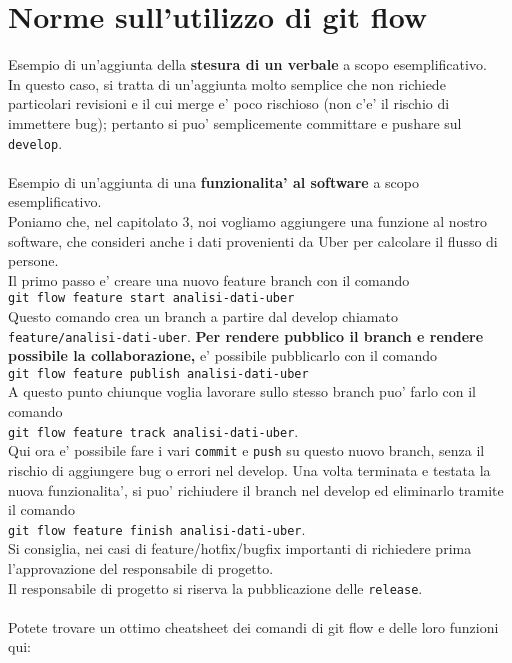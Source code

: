 \chapter{Norme sull'utilizzo di git flow}
Esempio di un'aggiunta della \textbf{stesura di un verbale} a scopo esemplificativo. \\
In questo caso, si tratta di un'aggiunta molto semplice che non richiede particolari revisioni e il cui merge e' poco rischioso (non c'e' il rischio di immettere bug); pertanto si puo' semplicemente committare e pushare sul \texttt{develop}.\\
\\
Esempio di un'aggiunta di una \textbf{funzionalita' al software} a scopo esemplificativo.\\
Poniamo che, nel capitolato 3, noi vogliamo aggiungere una funzione al nostro software, che consideri anche i dati provenienti da Uber per calcolare il flusso di persone.\\
Il primo passo e' creare una nuovo feature branch con il comando \\
\texttt{git flow feature start analisi-dati-uber}\\
Questo comando crea un branch a partire dal develop chiamato \texttt{feature/analisi-dati-uber}.
\textbf{Per rendere pubblico il branch e rendere possibile la collaborazione,} e' possibile pubblicarlo con il comando \\
\texttt{git flow feature publish analisi-dati-uber}\\
A questo punto chiunque voglia lavorare sullo stesso branch puo' farlo con il comando \\
\texttt{git flow feature track analisi-dati-uber}.\\
Qui ora e' possibile fare i vari \texttt{commit} e \texttt{push} su questo nuovo branch, senza il rischio di aggiungere bug o errori nel develop.
Una volta terminata e testata la nuova funzionalita', si puo' richiudere il branch nel develop ed eliminarlo tramite il comando \\
\texttt{git flow feature finish analisi-dati-uber}.\\
Si consiglia, nei casi di feature/hotfix/bugfix importanti di richiedere prima l'approvazione del responsabile di progetto.\\
Il responsabile di progetto si riserva la pubblicazione delle \texttt{release}.\\
\\
Potete trovare un ottimo cheatsheet dei comandi di git flow e delle loro funzioni qui:
